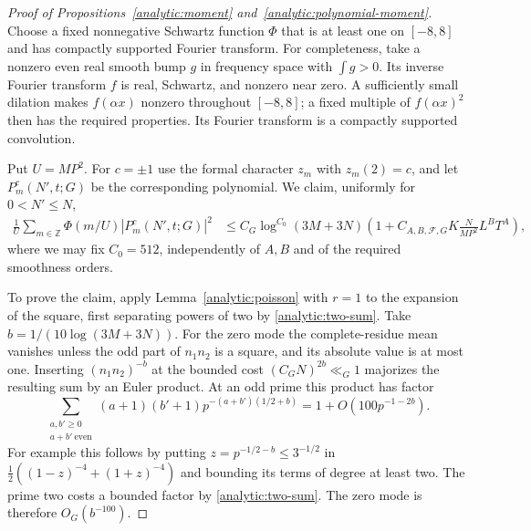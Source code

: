 \begin{proof}[Proof of Propositions~\ref{analytic:moment} and~\ref{analytic:polynomial-moment}]
Choose a fixed nonnegative Schwartz function $\Phi$ that is at least
one on $[-8,8]$ and has compactly supported Fourier transform. For
completeness, take a nonzero even real smooth bump $g$ in frequency
space with $\int g>0$. Its inverse Fourier transform $f$ is real,
Schwartz, and nonzero near zero. A sufficiently small dilation makes
$f(\alpha x)$ nonzero throughout $[-8,8]$; a fixed multiple of
$f(\alpha x)^2$ then has the required properties. Its Fourier
transform is a compactly supported convolution.

Put $U=MP^2$. For $c=\pm1$ use the formal character $z_m$ with
$z_m(2)=c$, and let $P_m^c(N',t;G)$ be the corresponding polynomial.
We claim, uniformly for $0<N'\leq N$,
\begin{align}
 \frac1U\sum_{m\in\mathbb Z}\Phi(m/U)|P_m^c(N',t;G)|^2
 &\leq C_G\log^{C_0}(3M+3N)
 \left(1+C_{A,B,\mathcal F,G}K\frac{N}{MP^2}L^BT^A\right),
 \label{analytic:inflated-moment}
\end{align}
where we may fix $C_0=512$, independently of $A,B$ and of the required
smoothness orders.

To prove the claim, apply Lemma~\ref{analytic:poisson} with $r=1$ to
the expansion of the square, first separating powers of two by
\eqref{analytic:two-sum}. Take
$b=1/(10\log(3M+3N))$. For the zero mode the complete-residue mean
vanishes unless the odd part of $n_1n_2$ is a square, and its absolute
value is at most one. Inserting $(n_1n_2)^{-b}$ at the bounded cost
$(C_GN)^{2b}\ll_G1$ majorizes the resulting sum by an Euler product.
At an odd prime this product has factor
\[
 \sum_{\substack{a,b'\geq0\\a+b'\ \mathrm{even}}}
       (a+1)(b'+1)p^{-(a+b')(1/2+b)}
 =1+O(100p^{-1-2b}).
\]
For example this follows by putting $z=p^{-1/2-b}\leq3^{-1/2}$ in
$\tfrac12((1-z)^{-4}+(1+z)^{-4})$ and bounding its terms of degree
at least two. The prime two costs a bounded factor by
\eqref{analytic:two-sum}. The zero mode is therefore $O_G(b^{-100})$.


\end{proof}
